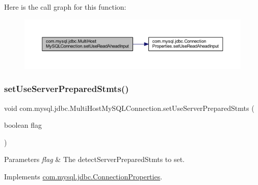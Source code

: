 Here is the call graph for this function\+:
\nopagebreak
\begin{figure}[H]
\begin{center}
\leavevmode
\includegraphics[width=350pt]{classcom_1_1mysql_1_1jdbc_1_1_multi_host_my_s_q_l_connection_a21f5fe21bfa20f67e36444ccc130fa4a_cgraph}
\end{center}
\end{figure}
\mbox{\label{classcom_1_1mysql_1_1jdbc_1_1_multi_host_my_s_q_l_connection_a94135430993c4b5420c93a25e97f2012}} 
\subsubsection{\texorpdfstring{set\+Use\+Server\+Prepared\+Stmts()}{setUseServerPreparedStmts()}}
{\footnotesize\ttfamily void com.\+mysql.\+jdbc.\+Multi\+Host\+My\+S\+Q\+L\+Connection.\+set\+Use\+Server\+Prepared\+Stmts (\begin{DoxyParamCaption}\item[{boolean}]{flag }\end{DoxyParamCaption})}


\begin{DoxyParams}{Parameters}
{\em flag} & The detect\+Server\+Prepared\+Stmts to set. \\
\hline
\end{DoxyParams}


Implements \mbox{\hyperlink{interfacecom_1_1mysql_1_1jdbc_1_1_connection_properties_ace9e4d9927b8eb7afd57054f4adf6316}{com.\+mysql.\+jdbc.\+Connection\+Properties}}.

